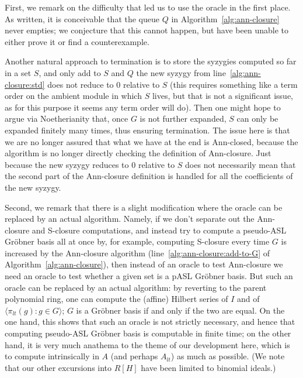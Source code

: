 \documentclass[11pt,reqno]{amsart}
\theoremstyle{definition}
\numberwithin{equation}{section}
\begin{document}
\begin{remark} \label{rmk:oracle}
First, we remark on the difficulty that led us to use the oracle in the first place. As written, it is conceivable that the queue $Q$ in Algorithm~\ref{alg:ann-closure} never empties; we conjecture that this cannot happen, but have been unable to either prove it or find a counterexample. 

Another natural approach to termination is to store the syzygies computed so far in a set $S$, and only add to $S$ and $Q$ the new syzygy from line~\ref{alg:ann-closure:std} does not reduce to $0$ relative to $S$ (this requires something like a term order on the ambient module in which $S$ lives, but that is not a significant issue, as for this purpose it seems any term order will do). Then one might hope to argue via Noetherianity that, once $G$ is not further expanded, $S$ can only be expanded finitely many times, thus ensuring termination. The issue here is that we are no longer assured that what we have at the end is Ann-closed, because the algorithm is no longer directly checking the definition of Ann-closure. Just because the new syzygy reduces to $0$ relative to $S$ does not necessarily mean that the second part of the Ann-closure definition is handled for all the coefficients of the new syzygy. 

Second, we remark that there is a slight modification where the oracle can be replaced by an actual algorithm. Namely, if we don't separate out the Ann-closure and S-closure computations, and instead try to compute a pseudo-ASL Gröbner basis all at once by, for example, computing S-closure every time $G$ is increased by the Ann-closure algorithm (line~\ref{alg:ann-closure:add-to-G} of Algorithm~\ref{alg:ann-closure}), then instead of an oracle to test Ann-closure we need an oracle to test whether a given set is a pASL Gröbner basis. But such an oracle can be replaced by an actual algorithm: by reverting to the parent polynomial ring, one can compute the (affine) Hilbert series of $I$ and of $\langle \pi_{lt}(g) : g \in G \rangle$; $G$ is a Gröbner basis if and only if the two are equal. On the one hand, this shows that such an oracle is not strictly necessary, and hence that computing pseudo-ASL Gröbner basis is computable in finite time; on the other hand, it is very much anathema to the theme of our development here, which is to compute intrinsically in $A$ (and perhaps $A_{lt}$) as much as possible. (We note that our other excursions into $R[H]$ have been limited to binomial ideals.)


\end{remark}
\end{document}
